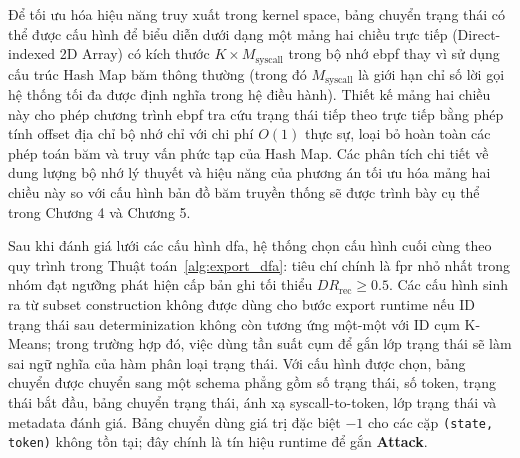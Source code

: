 \documentclass[../main.tex]{subfiles}
\begin{document}
Để tối ưu hóa hiệu năng truy xuất trong kernel space, bảng chuyển
trạng thái có thể được cấu hình để biểu diễn dưới dạng một mảng hai
chiều trực tiếp (Direct-indexed 2D Array) có kích thước $K \times
M_{\text{syscall}}$ trong bộ nhớ \gls{ebpf} thay vì sử dụng cấu trúc Hash
Map băm thông thường (trong đó $M_{\text{syscall}}$ là giới hạn chỉ
số lời gọi hệ thống tối đa được định nghĩa trong hệ điều hành). Thiết
kế mảng hai chiều này cho phép chương trình \gls{ebpf} tra cứu trạng thái
tiếp theo trực tiếp bằng phép tính offset địa chỉ bộ nhớ chỉ với chi
phí $O(1)$ thực sự, loại bỏ hoàn toàn các phép toán băm và truy vấn
phức tạp của Hash Map. Các phân tích chi tiết về dung lượng bộ nhớ lý
thuyết và hiệu năng của phương án tối ưu hóa mảng hai chiều này so
với cấu hình bản đồ băm truyền thống sẽ được trình bày cụ thể trong
Chương 4 và Chương 5.

Sau khi đánh giá lưới các cấu hình \gls{dfa}, hệ thống chọn cấu hình cuối
cùng theo quy trình trong Thuật toán~\ref{alg:export_dfa}: tiêu chí
chính là
\gls{fpr} nhỏ nhất trong nhóm đạt ngưỡng phát hiện cấp bản ghi tối thiểu
$DR_{\text{rec}} \geq 0.5$. Các cấu hình sinh ra từ subset
construction không được dùng
cho bước export runtime nếu ID trạng thái sau determinization không
còn tương ứng một-một
với ID cụm K-Means; trong trường hợp đó, việc dùng tần suất cụm để
gắn lớp trạng thái
sẽ làm sai ngữ nghĩa của hàm phân loại trạng thái. Với cấu hình được
chọn, bảng chuyển
được chuyển sang một schema phẳng gồm số trạng thái, số token, trạng
thái bắt đầu, bảng
chuyển trạng thái, ánh xạ \gls{syscall}-to-token, lớp trạng thái và
metadata đánh giá. Bảng
chuyển dùng giá trị đặc biệt $-1$ cho các cặp \texttt{(state, token)}
không tồn tại;
đây chính là tín hiệu runtime để gắn \textbf{Attack}.
\end{document}
